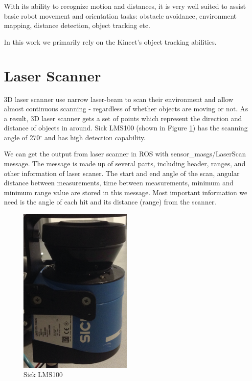 With its ability to recognize motion and distances, it is very well suited to assist basic robot movement and orientation tasks: obstacle avoidance, environment mapping, distance detection, object tracking etc.

In this work we primarily rely on the Kinect's object tracking abilities.
  
\section{Laser Scanner}
3D laser scanner use narrow laser-beam to scan their environment and allow almost continuous scanning - regardless of whether objects are moving or not. As a result, 3D laser scanner gets a set of points which represent the direction and distance of objects in around. Sick LMS100 (shown in Figure \ref{Laser}) has the scanning angle of  270$^\circ$ and has high detection capability.

We can get the output from laser scanner in ROS with sensor\_masgs/LaserScan message. The message is made up of several parts, including header, ranges, and other information of laser scaner. The start and end angle of the scan, angular distance between measurements, time between measurements, minimum and minimum range value are stored in this message. Most important information we need is the angle of each hit and its distance (range) from the scanner.

\begin{figure}[thpb]
      \centering
      \includegraphics[width=0.5\textwidth]{graphics/Laserscanner.png}
      \caption{Sick LMS100}
      \label{Laser}
   \end{figure}
